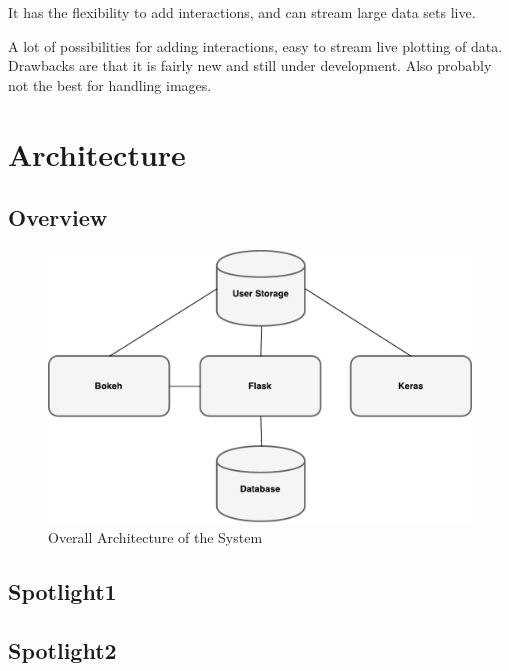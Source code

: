 It has the flexibility to add interactions, and can stream large data sets live.

A lot of possibilities for adding interactions, easy to stream live plotting of data. Drawbacks are that it is fairly new and still under development. Also probably not the best for handling images.

\section{Architecture}

\subsection{Overview}

\begin{figure}
    \centering
        \includegraphics[width=1\textwidth]{fig/overall-architecture.pdf}
        \caption{Overall Architecture of the System}
        \label{fig1}
\end{figure}

\subsection{Spotlight1}

\subsection{Spotlight2}



